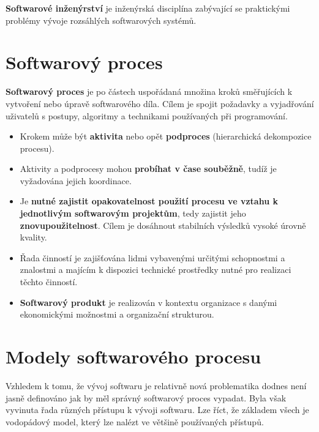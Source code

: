 \textbf{Softwarové inženýrství} je inženýrská disciplína zabývající se praktickými problémy vývoje rozsáhlých softwarových systémů.

\section{Softwarový proces}
\textbf{Softwarový proces} je po částech uspořádaná množina kroků směřujících k vytvoření nebo úpravě softwarového díla. Cílem je spojit požadavky a vyjadřování uživatelů s postupy, algoritmy a technikami používaných při programování.

\begin{itemize}
    \item Krokem může být \textbf{aktivita} nebo opět \textbf{podproces} (hierarchická dekompozice procesu).
    \item Aktivity a podprocesy mohou \textbf{probíhat v čase souběžně}, tudíž je vyžadována jejich koordinace.
    \item Je \textbf{nutné zajistit opakovatelnost použití procesu ve vztahu k jednotlivým softwarovým projektům}, tedy zajistit jeho \textbf{znovupoužitelnost}.  Cílem je dosáhnout stabilních výsledků vysoké úrovně kvality.
    \item Řada činností je zajišťována lidmi vybavenými určitými schopnostmi a znalostmi a majícím k dispozici technické prostředky nutné pro realizaci těchto činností.
    \item \textbf{Softwarový produkt} je realizován v kontextu organizace s danými ekonomickými možnostmi a organizační strukturou.
\end{itemize}

\section{Modely softwarového procesu}
Vzhledem k tomu, že vývoj softwaru je relativně nová problematika dodnes není jasně definováno jak by měl správný softwarový proces vypadat. Byla však vyvinuta řada různých přístupu k vývoji softwaru. Lze říct, že základem všech je vodopádový model, který lze nalézt ve většině používaných přístupů.

